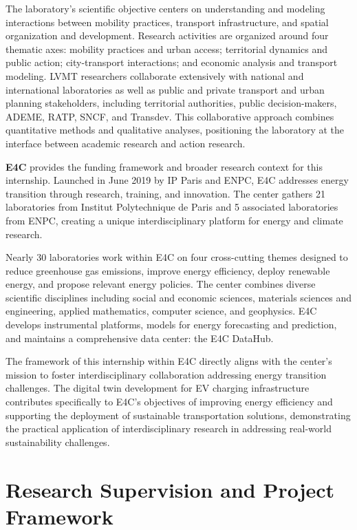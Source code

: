 The laboratory's scientific objective centers on understanding and modeling interactions between mobility practices, transport infrastructure, and spatial organization and development. Research activities are organized around four thematic axes: mobility practices and urban access; territorial dynamics and public action; city-transport interactions; and economic analysis and transport modeling. LVMT researchers collaborate extensively with national and international laboratories as well as public and private transport and urban planning stakeholders, including territorial authorities, public decision-makers, ADEME, RATP, SNCF, and Transdev. This collaborative approach combines quantitative methods and qualitative analyses, positioning the laboratory at the interface between academic research and action research.

\textbf{E4C} provides the funding framework and broader research context for this internship. Launched in June 2019 by IP Paris and ENPC, E4C addresses energy transition through research, training, and innovation. The center gathers 21 laboratories from Institut Polytechnique de Paris and 5 associated laboratories from ENPC, creating a unique interdisciplinary platform for energy and climate research.

Nearly 30 laboratories work within E4C on four cross-cutting themes designed to reduce greenhouse gas emissions, improve energy efficiency, deploy renewable energy, and propose relevant energy policies. The center combines diverse scientific disciplines including social and economic sciences, materials sciences and engineering, applied mathematics, computer science, and geophysics. E4C develops instrumental platforms, models for energy forecasting and prediction, and maintains a comprehensive data center: the E4C DataHub.

The framework of this internship within E4C directly aligns with the center's mission to foster interdisciplinary collaboration addressing energy transition challenges. The digital twin development for EV charging infrastructure contributes specifically to E4C's objectives of improving energy efficiency and supporting the deployment of sustainable transportation solutions, demonstrating the practical application of interdisciplinary research in addressing real-world sustainability challenges.

\section{Research Supervision and Project Framework}


